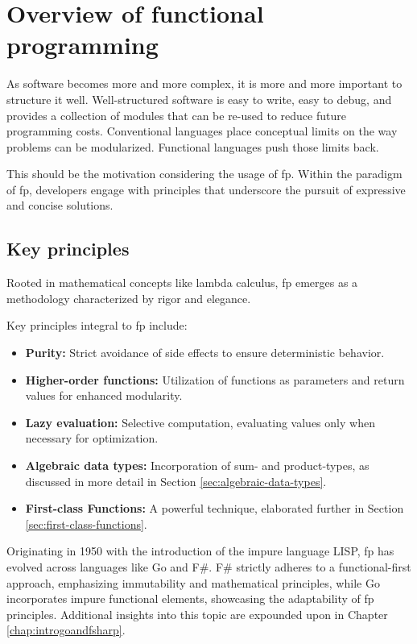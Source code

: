 \chapter{Overview of functional programming}\label{chap:functional-programming}
    \begin{shaded}
        \noindent
        \glqq{}As software becomes more and more complex, it is more and more important to structure it well. Well-structured software is easy to write, easy to debug, and provides a collection of modules that can be re-used to reduce future programming costs. Conventional languages place conceptual limits on the way problems can be modularized. Functional languages push those limits back.\grqq{} \cite{Hughes1989}
    \end{shaded}
    This should be the motivation considering the usage of \ac{fp}.
    Within the paradigm of \ac{fp}, developers engage with principles that underscore the pursuit of expressive and concise solutions.
    
\section{Key principles}
    
Rooted in mathematical concepts like lambda calculus, \ac{fp} emerges as a methodology characterized by rigor and elegance.

Key principles integral to \ac{fp} include:

\begin{itemize}
    \item \textbf{Purity:} Strict avoidance of side effects to ensure deterministic behavior.
    \item \textbf{Higher-order functions:} Utilization of functions as parameters and return values for enhanced modularity.
    \item \textbf{Lazy evaluation:} Selective computation, evaluating values only when necessary for optimization.
    \item \textbf{Algebraic data types:} Incorporation of sum- and product-types, as discussed in more detail in Section \ref{sec:algebraic-data-types}.
    \item \textbf{First-class Functions:} A powerful technique, elaborated further in Section \ref{sec:first-class-functions}.
\end{itemize}

Originating in 1950 with the introduction of the impure language LISP, \ac{fp} has evolved across languages like Go and F\#. F\# strictly adheres to a functional-first approach, emphasizing immutability and mathematical principles, while Go incorporates impure functional elements, showcasing the adaptability of \ac{fp} principles. Additional insights into this topic are expounded upon in Chapter \ref{chap:introgoandfsharp}.


